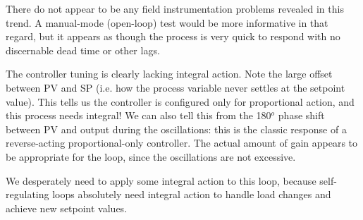 \vskip 10pt

There do not appear to be any field instrumentation problems revealed in this trend.  A manual-mode (open-loop) test would be more informative in that regard, but it appears as though the process is very quick to respond with no discernable dead time or other lags.

\vskip 10pt
  
The controller tuning is clearly lacking integral action.  Note the large offset between PV and SP (i.e. how the process variable never settles at the setpoint value).  This tells us the controller is configured only for proportional action, and this process needs integral!  We can also tell this from the 180$^{o}$ phase shift between PV and output during the oscillations: this is the classic response of a reverse-acting proportional-only controller.  The actual amount of gain appears to be appropriate for the loop, since the oscillations are not excessive.

\vskip 10pt

We desperately need to apply some integral action to this loop, because self-regulating loops absolutely need integral action to handle load changes and achieve new setpoint values.











